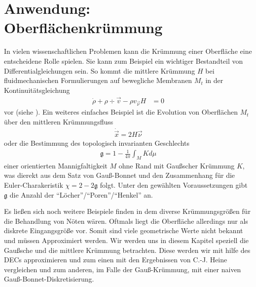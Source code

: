\chapter{Anwendung: Oberflächenkrümmung}
  
  \begin{ziel}
    In vielen wissenschaftlichen Problemen kann die Krümmung
    einer Oberfläche eine entscheidene Rolle spielen. 
    Sie kann zum Beispiel ein wichtiger Bestandteil von Differentialgleichungen sein.
    So kommt die mittlere Krümmung \( H \) bei fluidmechanischen Formulierungen auf bewegliche Membranen 
    \( M_{t} \) in der
    Kontinuitätsgleichung
    \begin{align}
      \dot{\rho} + \rho\div\vec{v} - \rho v_{\vec{\nu}} H &= 0
    \end{align}
    vor (siehe \cite{desimone}).
    Ein weiteres einfaches Beispiel ist die Evolution von Oberflächen \( M_{t} \) über den mittleren
    Krümmungsfluss
    \begin{align}
      \dot{\vec{x}} = 2 H \vec{\nu} 
    \end{align}
    oder die Bestimmung des topologisch invarianten Geschlechts
    \begin{align}
      \mathfrak{g} = 1 - \frac{1}{4\pi}\int_{M}Kd\mu
    \end{align}
    einer orientierten Mannigfaltigkeit \( M \) ohne Rand mit Gaußscher Krümmung \( K \),
    was dierekt aus dem Satz von Gauß-Bonnet 
    und den Zusammenhang für die Euler-Charakeristik \( \chi = 2-2\mathfrak{g} \) folgt.
    Unter den gewählten Voraussetzungen gibt \( \mathfrak{g} \) die Anzahl der "`Löcher"'/"`Poren"'/"`Henkel"' an.
    
    Es ließen sich noch weitere Beispiele finden in dem diverse Krümmungsgrößen für die Behandlung von
    Nöten wären.
    Oftmals liegt die Oberfläche allerdings nur als diskrete Eingangsgröße vor. 
    Somit sind viele
    geometrische Werte nicht bekannt und müssen Approximiert werden.
    Wir werden uns in diesem Kapitel speziell die Gaußsche und die mittlere Krümmung betrachten.
    Diese werden wir mit hilfe des DECs approximieren und zum einen mit den Ergebnissen von C.-J. Heine 
    \cite{heine} vergleichen und zum anderen, im Falle der Gauß-Krümmung, mit einer naiven 
    Gauß-Bonnet-Diskretisierung.
  \end{ziel}

